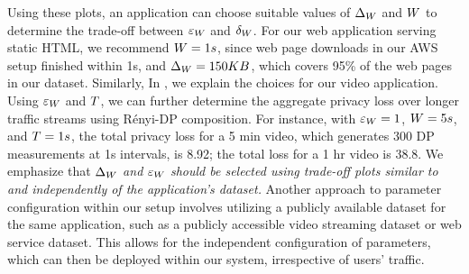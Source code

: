 Using these plots, an application can choose suitable values of $\Delta_{W}$ and $W$ to determine the trade-off between $\varepsilon_{W}$ and $\delta_{W}$.
For our web application serving static HTML, we recommend $W = 1s$, since web page downloads in our AWS setup finished within 1s, and $\Delta_{W} = 150 KB$, which covers 95\% of the web pages in our dataset.
Similarly, In , we explain the choices for our video application.
Using $\varepsilon_{W}$ and $T$, we can further determine the aggregate privacy loss over longer traffic streams using R\'enyi-DP composition.
For instance, with $\varepsilon_{W} = 1$, $W = 5s$, and $T = 1s$, the total privacy loss for a 5 min video, which generates 300 DP measurements at 1s intervals, is 8.92; the total loss for a 1 hr video is 38.8.
We emphasize that {\em $\Delta_{W}$ and $\varepsilon_W$ should be selected using trade-off plots similar to  and  independently of the application's dataset.}
Another approach to parameter configuration within our setup involves utilizing a publicly available dataset for the same application, such as a publicly accessible video streaming dataset or web service dataset.
This allows for the independent configuration of parameters, which can then be deployed within our system, irrespective of users' traffic.




